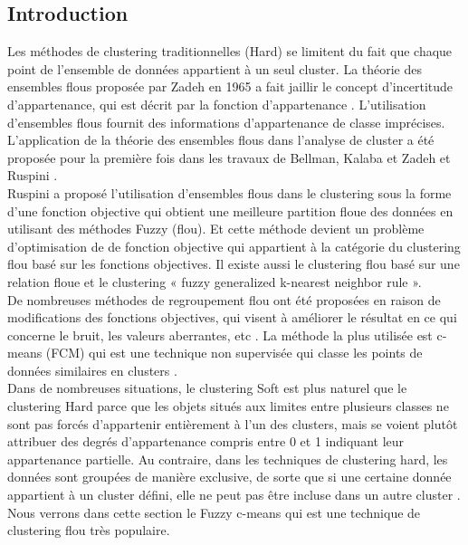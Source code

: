 \subsection{Introduction}
Les méthodes de clustering traditionnelles (Hard) se limitent du fait que chaque point de l'ensemble de données appartient à un seul cluster. La théorie des ensembles flous proposée par Zadeh \cite{zadeh1965information} en 1965 a fait jaillir le concept d'incertitude d'appartenance, qui est décrit par la fonction d'appartenance \cite{yang1993survey}. L'utilisation d'ensembles flous fournit des informations d'appartenance de classe imprécises. L'application de la théorie des ensembles flous dans l'analyse de cluster a été proposée pour la première fois dans les travaux de Bellman, Kalaba et Zadeh \cite{zadeh1965information} et Ruspini \cite{ruspini1969new}. \\
Ruspini a proposé l'utilisation d'ensembles flous dans le clustering sous la forme d'une fonction objective qui obtient une meilleure partition floue des données en utilisant des méthodes Fuzzy (flou). Et cette méthode devient un problème d’optimisation de de fonction objective qui appartient à la catégorie du clustering flou basé sur les fonctions objectives. Il existe aussi le clustering flou basé sur une relation floue et le clustering « fuzzy generalized k-nearest neighbor rule ».\\
De nombreuses méthodes de regroupement flou ont été proposées en raison de modifications des fonctions objectives, qui visent à améliorer le résultat en ce qui concerne le bruit, les valeurs aberrantes, etc \cite{zhou2016method}. La méthode la plus utilisée est c-means (FCM) qui est une technique non supervisée qui classe les points de données similaires en clusters \cite{gurrutxaga2010sep}.\\
Dans de nombreuses situations, le clustering Soft est plus naturel que le clustering Hard parce que les objets situés aux limites entre plusieurs classes ne sont pas forcés d'appartenir entièrement à l'un des clusters, mais se voient plutôt attribuer des degrés d'appartenance compris entre 0 et 1 indiquant leur appartenance partielle. Au contraire, dans les techniques de clustering hard, les données sont groupées de manière exclusive, de sorte que si une certaine donnée appartient à un cluster défini, elle ne peut pas être incluse dans un autre cluster \cite{bora2014comparative}. Nous verrons dans cette section le Fuzzy c-means qui est une technique de clustering flou très populaire.\\

